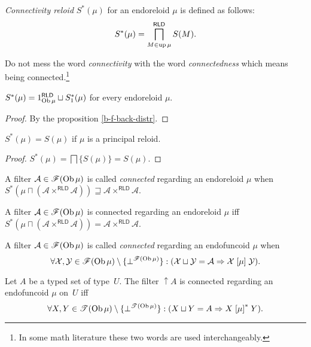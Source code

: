 \begin{defn}
\emph{Connectivity reloid} $S^{\ast}(\mu)$
for an endoreloid $\mu$ is defined as follows:
\[
S^{\ast}(\mu)=\bigsqcap_{M\in\operatorname{up}\mu}^{\mathsf{RLD}}S(M).
\]

\end{defn}
Do not mess the word \emph{connectivity} with the word \emph{connectedness}
which means being connected.\footnote{In some math literature these two words are used interchangeably.}
\begin{prop}
$S^{\ast}(\mu)=1_{\operatorname{Ob}\mu}^{\mathsf{RLD}}\sqcup S_{1}^{\ast}(\mu)$
for every endoreloid $\mu$.\end{prop}
\begin{proof}
By the proposition \ref{b-f-back-distr}.\end{proof}
\begin{prop}
$S^{\ast}(\mu)=S(\mu)$ if $\mu$ is a principal reloid.\end{prop}
\begin{proof}
$S^{\ast}(\mu)=\bigsqcap\{S(\mu)\}=S(\mu)$.\end{proof}
\begin{defn}
A filter $\mathcal{A}\in\mathscr{F}(\operatorname{Ob}\mu)$
is called \emph{connected} regarding an endoreloid $\mu$ when $S^{\ast}(\mu\sqcap(\mathcal{A}\times^{\mathsf{RLD}}\mathcal{A}))\sqsupseteq\mathcal{A}\times^{\mathsf{RLD}}\mathcal{A}$.\end{defn}
\begin{obvious}
A filter $\mathcal{A}\in\mathscr{F}(\operatorname{Ob}\mu)$ is connected regarding
an endoreloid $\mu$ iff $S^{\ast}(\mu\sqcap(\mathcal{A}\times^{\mathsf{RLD}}\mathcal{A}))=\mathcal{A}\times^{\mathsf{RLD}}\mathcal{A}$.\end{obvious}
\begin{defn}
A filter $\mathcal{A}\in\mathscr{F}(\operatorname{Ob}\mu)$
is called \emph{connected} regarding an endofuncoid $\mu$ when
\[
\forall\mathcal{X},\mathcal{Y}\in\mathscr{F}(\operatorname{Ob}\mu)\setminus\{\bot^{\mathscr{F}(\operatorname{Ob}\mu)}\}:(\mathcal{X}\sqcup\mathcal{Y}=\mathcal{A}\Rightarrow\mathcal{X}\mathrel{\left[\mu\right]}\mathcal{Y}).
\]
\end{defn}
\begin{prop}
Let $A$ be a typed set of type~$U$. The filter $\uparrow A$ is
connected regarding an endofuncoid $\mu$ on~$U$ iff
\[
\forall X,Y\in\mathscr{T}(\operatorname{Ob}\mu)\setminus\{\bot^{\mathscr{T}(\operatorname{Ob}\mu)}\}:(X\sqcup Y=A\Rightarrow X\mathrel{\left[\mu\right]^{\ast}}Y).
\]
\end{prop}
